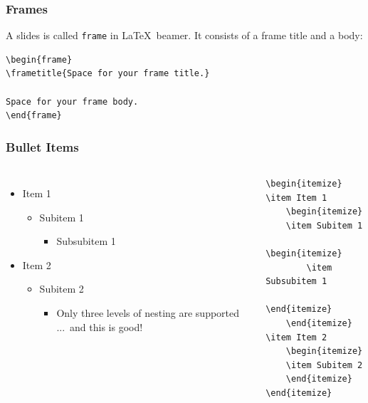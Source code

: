 \documentclass[utf8,aspectratio=169,ngerman,english]{beamer}
\begin{document}
\begin{frame}[containsverbatim]
\frametitle{Frames}

A slides is called \verb|frame| in \LaTeX\ beamer. It consists of a frame title and a body:
\begin{lstlisting}[language={[LaTeX]TeX},numbers=none]
\begin{frame}
\frametitle{Space for your frame title.}

Space for your frame body.
\end{frame}
\end{lstlisting}
\end{frame}


\begin{frame}[containsverbatim]
\frametitle{Bullet Items}

\begin{columns}[onlytextwidth,T]

\begin{itemize}
\item Item 1
    \begin{itemize}
    \item Subitem 1
        \begin{itemize}
        \item Subsubitem 1
        \end{itemize}
    \end{itemize}
\item Item 2
    \begin{itemize}
    \item Subitem 2
        \begin{itemize}
        \item Only three levels of nesting are supported ...~and this is good!
        \end{itemize}
    \end{itemize}
\end{itemize}

\begin{lstlisting}[language={[LaTeX]TeX},numbers=none]
\begin{itemize}
\item Item 1
    \begin{itemize}
    \item Subitem 1
        \begin{itemize}
        \item Subsubitem 1
        \end{itemize}
    \end{itemize}
\item Item 2
    \begin{itemize}
    \item Subitem 2
    \end{itemize}
\end{itemize} 
\end{lstlisting}

\end{columns}
\end{frame}
\end{document}
